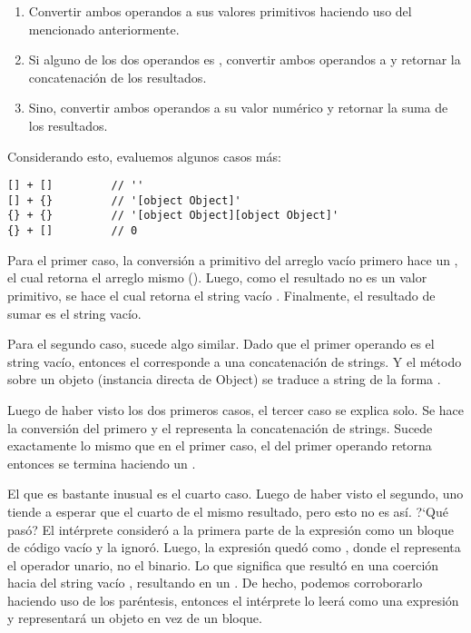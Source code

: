 \begin{enumerate}
\item Convertir ambos operandos a sus valores primitivos haciendo uso del  mencionado anteriormente.
\item Si alguno de los dos operandos es , convertir ambos operandos a  y retornar la concatenación de los resultados.
\item Sino, convertir ambos operandos a su valor numérico y retornar la suma de los resultados.
\end{enumerate}

Considerando esto, evaluemos algunos casos más:

\begin{lstlisting}[title={Operador \code{+} con arreglos y objetos}]
[] + []			// ''
[] + {}			// '[object Object]'
{} + {}			// '[object Object][object Object]'
{} + []			// 0
\end{lstlisting}

Para el primer caso, la conversión a primitivo del arreglo vacío \code{[]} primero hace un , el cual retorna el arreglo mismo (). Luego, como el resultado no es un valor primitivo, se hace  el cual retorna el string vacío . Finalmente, el resultado de sumar \code{[] + []} es el string vacío.

Para el segundo caso, sucede algo similar. Dado que el primer operando es el string vacío, entonces el \code{+} corresponde a una concatenación de strings. Y el método  sobre un objeto (instancia directa de Object) se traduce a string de la forma .

Luego de haber visto los dos primeros casos, el tercer caso se explica solo. Se hace la conversión del primero y el \code{+} representa la concatenación de strings. Sucede exactamente lo mismo que en el primer caso, el  del primer operando retorna  entonces se termina haciendo un .

El que es bastante inusual es el cuarto caso. Luego de haber visto el segundo, uno tiende a esperar que el cuarto de el mismo resultado, pero esto no es así. ?`Qué pasó? El intérprete consideró a la primera parte de la expresión como un bloque de código vacío y la ignoró. Luego, la expresión quedó como \code{+[]}, donde el \code{+} representa el operador unario, no el binario. Lo que significa que resultó en una coerción hacia  del string vacío , resultando en un . De hecho, podemos corroborarlo haciendo uso de los paréntesis, entonces el intérprete lo leerá como una expresión y \code{\{\}} representará un objeto en vez de un  bloque.

